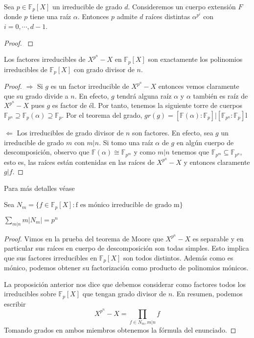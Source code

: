 \begin{proposition}
	Sea $p \in \mathbb{F}_p[X]$ un irreducible de grado $d$. Consideremos un cuerpo extensión $F$ donde $p$ tiene una raíz $\alpha$. Entonces $p$ admite $d$ raíces distintas $\alpha^{p^i}$ con $i = 0,\cdots,d-1$. 
\end{proposition}
\begin{proof}
	\cite{link3}
\end{proof}

\begin{proposition}
	Los factores irreducibles de $X^{p^n} - X$ en $\mathbb{F}_p[X]$ son exactamente los polinomios irreducibles de $\mathbb{F}_p[X]$ con grado divisor de $n$. 
\end{proposition} 
\begin{proof}
	$\Rightarrow$ Si $g$ es un factor irreducible de $X^{p^n} - X$ entonces vemos claramente que su grado divide a $n$. En efecto, $g$ tendrá alguna raíz $\alpha$ y $\alpha$ también es raíz de $X^{p^n} - X$ pues $g$ es factor de él. Por tanto, tenemos la siguiente torre de cuerpos $\mathbb{F}_{p^n} \supseteq \mathbb{F}_{p}(\alpha) \supseteq \mathbb{F}_p$. Por el teorema del grado, $gr(g) = [\mathbb{F}(\alpha):\mathbb{F}_p] | [\mathbb{F}_{p^n}:\mathbb{F}_p]$l
	
	$\Leftarrow$ Los irreducibles de grado divisor de $n$ son factores. En efecto, sea $g$ un irreducible de grado $m$ con $m|n$. Si tomo una raíz $\alpha$ de $g$ en algún cuerpo de descomposición, observo que $\mathbb{F}(\alpha) \cong \mathbb{F}_{p^m}$ y como $m|n$ tenemos que $\mathbb{F}_{p^m} \subseteq \mathbb{F}_{p^n}$, esto es, las raíces están contenidas en las raíces de $X^{p^n} - X$ y entonces claramente $g|f$. 
\end{proof}

Para más detalles véase \cite{link3}

Sea $N_m = \{f \in \mathbb{F}_p[X]:\text{f es mónico irreducible de grado m}\}$

\begin{proposition}
	$\sum_{m|n} m |N_m| = p^n$
\end{proposition}
\begin{proof}
	Vimos en la prueba del teorema de Moore que $X^{p^n} - X$ es separable y en particular sus raíces en cuerpo de descomposición son todas simples. Esto implica que sus factores irreducibles en $\mathbb{F}_p[X]$ son todos distintos. Además como es mónico, podemos obtener su factorización como producto de polinomios mónicos. 
	
	La proposición anterior nos dice que debemos considerar como factores todos los irreducibles sobre $\mathbb{F}_p[X]$ que tengan grado divisor de $n$. En resumen, podemos escribir $$X^{p^n} - X = \prod_{f \in N_m, m|n} f$$ Tomando grados en ambos miembros obtenemos la fórmula del enunciado. 
\end{proof}

